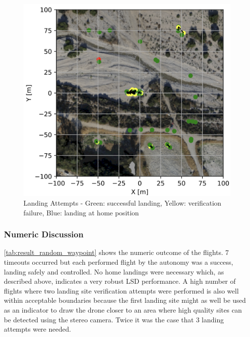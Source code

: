     \begin{figure}[h]
        \begin{center}
            \includegraphics[scale=0.5]{images/evaluation/landings_random_WP_GT.png}
            \caption{Landing Attempts - Green: successful landing, Yellow: verification failure, Blue: landing at home position}
            \label{fig:landing_attempts_random_WP}
        \end{center}
    \end{figure}

    \subsubsection{Numeric Discussion}
    \cref{tab:result_random_waypoint} shows the numeric outcome of the flights. 7 timeouts occurred but each performed flight by the autonomy was a success, landing safely and controlled. No home landings were necessary which, as described above, indicates a very robust LSD performance. A high number of flights where two landing site verification attempts were performed is also well within acceptable boundaries because the first landing site might as well be used as an indicator to draw the drone closer to an area where high quality sites can be detected using the stereo camera. Twice it was the case that 3 landing attempts were needed.

